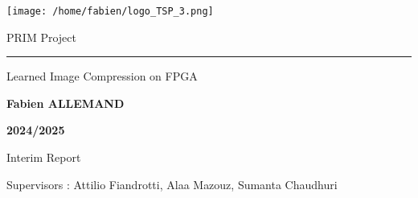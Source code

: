 \thispagestyle{empty}
\begin{center}
\texttt{[image: /home/fabien/logo\_TSP\_3.png]}

\vfill

{\fontsize{30}{30}\selectfont PRIM Project}

\rule{\textwidth}{1pt}

\bigskip

{\fontsize{22}{22}\selectfont Learned Image Compression on FPGA}

\medskip

{\fontsize{18}{18}\selectfont \bf Fabien ALLEMAND}

\medskip

{\fontsize{14}{14}\selectfont \bf 2024/2025}

\vfill

{Interim Report}

\vfill

\end{center}

{Supervisors : Attilio Fiandrotti, Alaa Mazouz, Sumanta Chaudhuri}